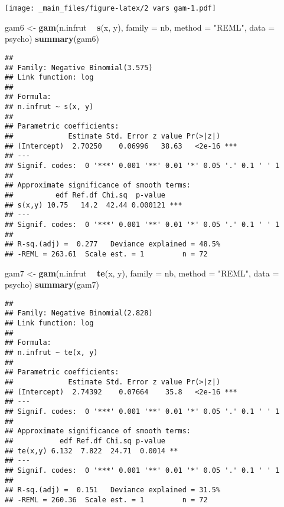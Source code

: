 \documentclass[
]{book}
\newenvironment{Shaded}{\begin{snugshade}}{\end{snugshade}}
\newcommand{\DataTypeTok}[1]{\textcolor[rgb]{0.13,0.29,0.53}{#1}}
\newcommand{\KeywordTok}[1]{\textcolor[rgb]{0.13,0.29,0.53}{\textbf{#1}}}
\newcommand{\NormalTok}[1]{#1}
\newcommand{\OperatorTok}[1]{\textcolor[rgb]{0.81,0.36,0.00}{\textbf{#1}}}
\newcommand{\StringTok}[1]{\textcolor[rgb]{0.31,0.60,0.02}{#1}}
\begin{document}
\begin{Shaded}
\end{Shaded}

\texttt{[image: \_main\_files/figure-latex/2 vars gam-1.pdf]}

\begin{Shaded}
\begin{Highlighting}[]
\NormalTok{gam6 <-}\StringTok{ }\KeywordTok{gam}\NormalTok{(n.infrut }\OperatorTok{~}\StringTok{ }\KeywordTok{s}\NormalTok{(x, y), }\DataTypeTok{family =}\NormalTok{ nb, }\DataTypeTok{method =} \StringTok{"REML"}\NormalTok{, }\DataTypeTok{data =}\NormalTok{ psycho)}
\KeywordTok{summary}\NormalTok{(gam6)}
\end{Highlighting}
\end{Shaded}

\begin{verbatim}
## 
## Family: Negative Binomial(3.575) 
## Link function: log 
## 
## Formula:
## n.infrut ~ s(x, y)
## 
## Parametric coefficients:
##             Estimate Std. Error z value Pr(>|z|)    
## (Intercept)  2.70250    0.06996   38.63   <2e-16 ***
## ---
## Signif. codes:  0 '***' 0.001 '**' 0.01 '*' 0.05 '.' 0.1 ' ' 1
## 
## Approximate significance of smooth terms:
##          edf Ref.df Chi.sq  p-value    
## s(x,y) 10.75   14.2  42.44 0.000121 ***
## ---
## Signif. codes:  0 '***' 0.001 '**' 0.01 '*' 0.05 '.' 0.1 ' ' 1
## 
## R-sq.(adj) =  0.277   Deviance explained = 48.5%
## -REML = 263.61  Scale est. = 1         n = 72
\end{verbatim}

\begin{Shaded}
\begin{Highlighting}[]
\NormalTok{gam7 <-}\StringTok{ }\KeywordTok{gam}\NormalTok{(n.infrut }\OperatorTok{~}\StringTok{ }\KeywordTok{te}\NormalTok{(x, y), }\DataTypeTok{family =}\NormalTok{ nb, }\DataTypeTok{method =} \StringTok{"REML"}\NormalTok{, }\DataTypeTok{data =}\NormalTok{ psycho) }
\KeywordTok{summary}\NormalTok{(gam7)}
\end{Highlighting}
\end{Shaded}

\begin{verbatim}
## 
## Family: Negative Binomial(2.828) 
## Link function: log 
## 
## Formula:
## n.infrut ~ te(x, y)
## 
## Parametric coefficients:
##             Estimate Std. Error z value Pr(>|z|)    
## (Intercept)  2.74392    0.07664    35.8   <2e-16 ***
## ---
## Signif. codes:  0 '***' 0.001 '**' 0.01 '*' 0.05 '.' 0.1 ' ' 1
## 
## Approximate significance of smooth terms:
##           edf Ref.df Chi.sq p-value   
## te(x,y) 6.132  7.822  24.71  0.0014 **
## ---
## Signif. codes:  0 '***' 0.001 '**' 0.01 '*' 0.05 '.' 0.1 ' ' 1
## 
## R-sq.(adj) =  0.151   Deviance explained = 31.5%
## -REML = 260.36  Scale est. = 1         n = 72
\end{verbatim}
\end{document}
